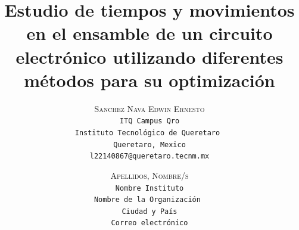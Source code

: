     \lfoot{ \thepage}
    
    \setlength{\droptitle}{-5\baselineskip} %
    \title{\textbf{Estudio de tiempos y movimientos en el ensamble de un circuito electrónico utilizando diferentes métodos para su optimización}} %
    
     \author{ 
     \textsc{Sanchez Nava Edwin Ernesto}\\ 
     \texttt{ ITQ Campus Qro } \\ 
     \texttt{Instituto Tecnológico de Queretaro } \\ 
     \texttt{Queretaro, Mexico}\\ 
     \texttt{l22140867@queretaro.tecnm.mx} 
     \and 
     \textsc{Apellidos, Nombre/s}\\ 
     \texttt{ Nombre Instituto } \\ 
     \texttt{Nombre de la Organización } \\ 
     \texttt{Ciudad y País}\\ 
     \texttt{Correo electrónico} 
    }
    
    
    
    
    \maketitle
    \thispagestyle{fancy}
    
